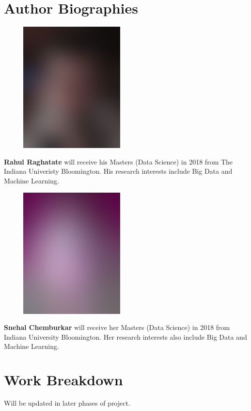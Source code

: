 \documentclass[9pt,twocolumn,twoside]{../../styles/osajnl}
\begin{document}
\section*{Author Biographies}
\begingroup \setlength\intextsep{0pt}
\begin{minipage}[t][3.2cm][t]{1.0\columnwidth}
  \begin{figure}
    \includegraphics[width=0.25\columnwidth]{images/john_smith.eps}
  \end{figure}
  \noindent
  {\bfseries Rahul Raghatate} will receive his Masters (Data Science)
  in 2018 from The Indiana Univeristy Bloomington. His research
  interests include Big Data and Machine Learning.
\end{minipage}
\begin{minipage}[t][3.2cm][t]{1.0\columnwidth} %
  \begin{figure}
    \includegraphics[width=0.25\columnwidth]{images/alice_smith.eps}
  \end{figure}
  \noindent
  {\bfseries Snehal Chemburkar} will receive her Masters (Data
  Science) in 2018 from Indiana University Bloomington. Her research
  interests also include Big Data and Machine Learning.
\end{minipage}
\endgroup
\newpage

\appendix
\section{Work Breakdown}
Will be updated in later phases of project.
\end{document}
